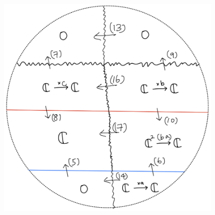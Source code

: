 \begin{figure}[H]
    \centering
    \includegraphics[scale = 0.45]{diagrams/cobord'2/44.png} 
    \caption{}
    \label{fig:your-label}
\end{figure}
